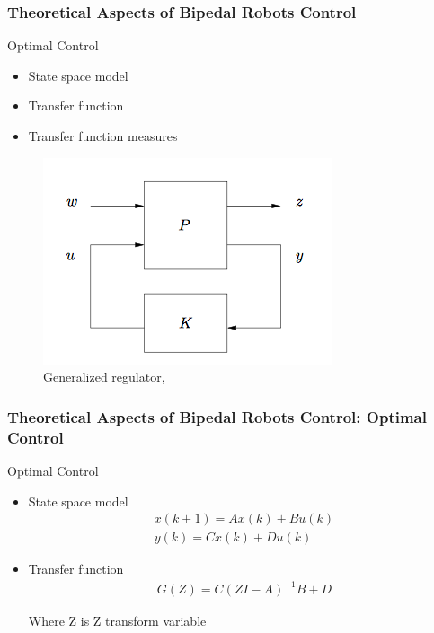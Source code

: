\documentclass{beamer}
\begin{document}
	\begin{frame}
		\frametitle{Theoretical Aspects of Bipedal Robots Control}
		\begin{block}{Optimal Control}
			\begin{itemize}
				\item
					State space model
				\item
					Transfer function
				\item
					Transfer function measures
			\end{itemize}
		\end{block}
		
		\begin{figure}[h!]
			\includegraphics[width=0.5\linewidth]{presentation_images/15}
			\caption{Generalized regulator, \cite{hazell2008discrete}}
		\end{figure}
	\end{frame}


	\begin{frame}
		\frametitle{Theoretical Aspects of Bipedal Robots Control: Optimal Control}
		\begin{block}{Optimal Control}
			\begin{itemize}
				\item
					State space model
					\begin{equation}
						\begin{split}
							x(k+1) = Ax(k) + Bu(k)\\
							y(k) = Cx(k) + Du(k)
						\end{split}
					\end{equation}
				\item
					Transfer function
					\begin{equation}
						\begin{split}
							G(Z) = C(ZI - A)^{-1} B + D
						\end{split}
					\end{equation}
					
					Where Z is Z transform variable
			\end{itemize}
		\end{block}
	\end{frame}
	
\end{document}
